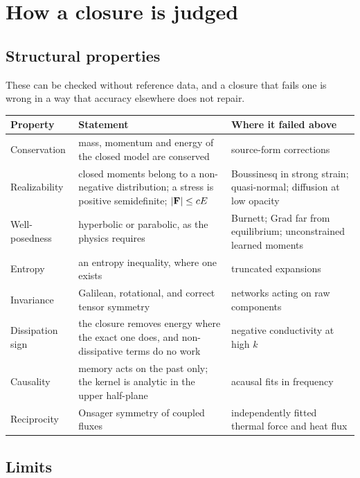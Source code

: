 \section{How a closure is judged}
\label{sec:judge}

\subsection{Structural properties}

These can be checked without reference data, and a closure that fails one
is wrong in a way that accuracy elsewhere does not repair.
\begin{center}
\renewcommand{\arraystretch}{1.3}
\begin{tabularx}{\textwidth}{@{}P{3.3cm}YP{4.4cm}@{}}
\toprule
Property & Statement & Where it failed above \\
\midrule
Conservation & mass, momentum and energy of the closed model are conserved
  & source-form corrections \\
Realizability & closed moments belong to a non-negative distribution; a
  stress is positive semidefinite; $|\mathbf{F}|\le cE$
  & Boussinesq in strong strain; quasi-normal; diffusion at low opacity \\
Well-posedness & hyperbolic or parabolic, as the physics requires
  & Burnett; Grad far from equilibrium; unconstrained learned moments \\
Entropy & an entropy inequality, where one exists & truncated expansions \\
Invariance & Galilean, rotational, and correct tensor symmetry
  & networks acting on raw components \\
Dissipation sign & the closure removes energy where the exact one does, and
  non-dissipative terms do no work
  & negative conductivity at high $k$ \\
Causality & memory acts on the past only; the kernel is analytic in the
  upper half-plane
  & acausal fits in frequency \\
Reciprocity & Onsager symmetry of coupled fluxes & independently fitted
  thermal force and heat flux \\
\bottomrule
\end{tabularx}
\end{center}

\subsection{Limits}


